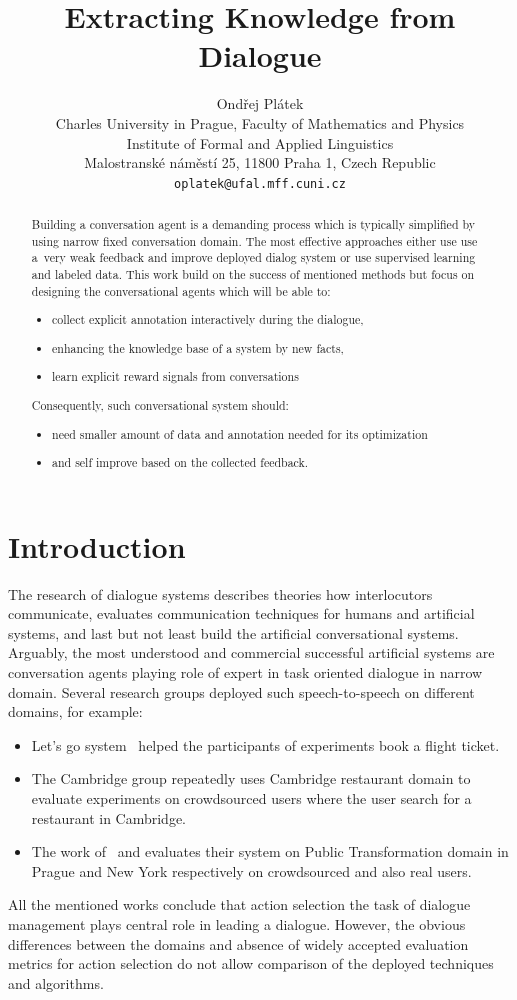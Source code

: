 \documentclass[11pt]{article}
\title{Extracting Knowledge from Dialogue}
\author{Ondřej Plátek \\
  Charles University in Prague, Faculty of Mathematics and Physics \\
  Institute of Formal and Applied Linguistics \\
  Malostranské náměstí 25, 11800 Praha 1, Czech Republic\\
  {\tt oplatek@ufal.mff.cuni.cz}\\}
\date{}
\begin{document}
\maketitle
\begin{abstract}
Building a conversation agent is a demanding process which is typically simplified by using narrow fixed conversation domain.
The most effective approaches either use use a~very weak feedback and improve deployed dialog system or use supervised learning and labeled data.
This work build on the success of mentioned methods but focus on designing the conversational agents which will be able to:
\begin{itemize}
    \item collect explicit annotation interactively during the dialogue,
    \item enhancing the knowledge base of a system by new facts,
    \item learn explicit reward signals from conversations
\end{itemize}
Consequently, such conversational system should:
\begin{itemize}
    \item need smaller amount of data and annotation needed for its optimization 
    \item and self improve based on the collected feedback.
\end{itemize}
\end{abstract}

\section{Introduction}
\label{sec:introduction}

The research of dialogue systems describes theories how interlocutors communicate, evaluates communication techniques for humans and artificial systems, and last but not least build the artificial conversational systems.
Arguably, the most understood and commercial successful artificial systems are conversation agents playing role of expert in task oriented dialogue in narrow domain.
Several research groups deployed such speech-to-speech on different domains, for example:
\begin{itemize}
    \item Let's go system~\cite{raux_lets_2005} helped the participants of experiments book a flight ticket.
    \item The Cambridge group repeatedly uses Cambridge restaurant domain to evaluate experiments on crowdsourced users where the user search for a restaurant in Cambridge.
    \item The work of~\cite{dusek_sequence2sequence_2016} and \cite{vejman_martin_development_2015} evaluates their system on Public Transformation domain in Prague and New York respectively on crowdsourced and also real users. 
\end{itemize}
All the mentioned works conclude that action selection the task of dialogue management plays central role in leading a dialogue.
However, the obvious differences between the domains and absence of widely accepted evaluation metrics for action selection do not allow comparison of the deployed techniques and algorithms.
\end{document}
